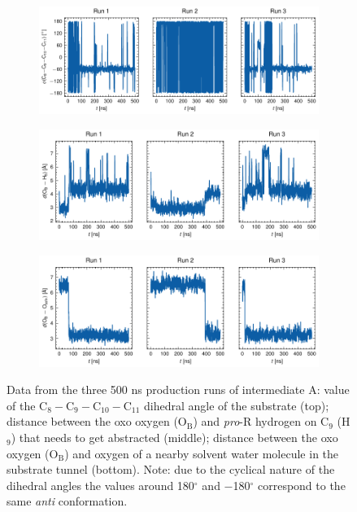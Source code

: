 \begin{figure}[htbp]
    \centering
    \begin{subfigure}{\textwidth}
        \centering
        \includegraphics[width=\textwidth]{Figures/A_C9-C10_all.pdf}
    \end{subfigure}
    \par\bigskip
    \begin{subfigure}{\textwidth}
        \centering
        \includegraphics[width=\textwidth]{Figures/A_Ob-H9_all.pdf}
    \end{subfigure}
    \par\bigskip
    \begin{subfigure}{\textwidth}
        \centering
        \includegraphics[width=\textwidth]{Figures/A_Ob-Ow_all.pdf}
    \end{subfigure}
    \caption{Data from the three 500 ns production runs of intermediate A: value of the C$_8-$C$_9-$C$_{10}-$C$_{11}$ dihedral angle of the substrate (top); distance between the oxo oxygen (O$_{\text{B}}$) and \textit{pro}-R hydrogen on C$_9$ (H$_{9}$) that needs to get abstracted (middle); distance between the oxo oxygen (O$_{\text{B}}$) and oxygen of a nearby solvent water molecule in the substrate tunnel (bottom). Note: due to the cyclical nature of the dihedral angles the values around 180$^{\circ}$ and $-$180$^{\circ}$ correspond to the same \textit{anti} conformation.}
    \label{fig:A_prodcution}
\end{figure}

